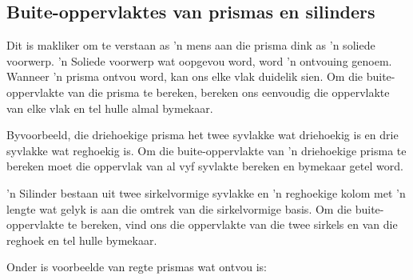 \subsection{Buite-oppervlaktes van prismas en silinders}

Dit is makliker om te verstaan as ’n mens aan die prisma dink as ’n soliede voorwerp.
'n Soliede voorwerp wat oopgevou word, word 'n ontvouing genoem. Wanneer 'n prisma ontvou word, kan ons elke vlak duidelik sien. Om die buite-oppervlakte van die prisma te bereken, bereken ons eenvoudig die oppervlakte van elke vlak en tel hulle almal bymekaar.
\par 


Byvoorbeeld, die driehoekige prisma het twee syvlakke wat driehoekig is en drie syvlakke wat reghoekig is. Om die buite-oppervlakte van ’n driehoekige prisma te bereken moet die oppervlak van al vyf syvlakte bereken en bymekaar getel word.
  \par
’n Silinder bestaan uit twee sirkelvormige syvlakke en ’n reghoekige kolom met 'n lengte wat gelyk is aan die omtrek van die sirkelvormige basis. Om die buite-oppervlakte te bereken, vind ons die oppervlakte van die twee sirkels en van die reghoek en tel hulle bymekaar.\par
{}
\par
Onder is voorbeelde van regte prismas wat ontvou is:

